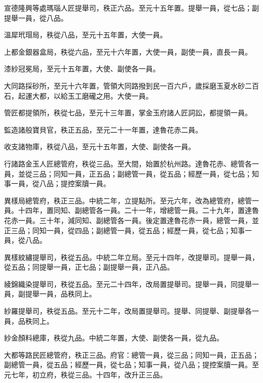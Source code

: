 \begin{pinyinscope}
 宣德隆興等處瑪瑙人匠提舉司，秩正六品。至元十五年置。提舉一員，從七品；副提舉一員，從八品。



 溫犀玳瑁局，秩從八品，至元十五年置，大使一員。



 上都金銀器盒局，秩從六品，至元十六年置，大使一員，副使一員，直長一員。



 漆紗冠冕局，至元十五年置，大使、副使各一員。



 大同路採砂所，至元十六年置，管領大同路撥到民一百六戶，歲採磨玉夏水砂二百石，起運大都，以給玉工磨礲之用。大使一員。



 管匠都提領所，秩從七品，至元十三年置，掌金玉府諸人匠詞訟，都提領一員。



 監造諸般寶貝官，秩正五品，至元二十一年置，達魯花赤二員。



 收支諸物庫，秩從八品，至元十五年置，大使、副使各一員。



 行諸路金玉人匠總管府，秩從三品。至大間，始置於杭州路。達魯花赤、總管各一員，並從三品；同知一員，正五品；副總管一員，從五品；經歷一員，從七品；知事一員，從八品；提控案牘一員。



 異樣局總管府，秩正三品。中統二年，立提點所。至元六年，改為總管府，總管一員。十四年，置同知、副總管各一員。二十一年，增總管一員。二十九年，置達魯花赤一員。三十年，減同知、副總管各一員。後定置達魯花赤一員，總管一員，並正三品；同知一員，從四品；副總管一員，從五品；經歷一員，從七品；知事一員，從八品。



 異樣紋繡提舉司，秩從五品。中統二年立局。至元十四年，改提舉司。提舉一員，從五品；同提舉一員，正七品；副提舉一員，正八品。



 綾錦織染提舉司，秩從五品。至元二十四年，改局置提舉司。提舉一員，同提舉一員，副提舉一員，品秩同上。



 紗羅提舉司，秩從五品。至元十二年，改局置提舉司。提舉、同提舉、副提舉各一員，品秩同上。



 紗金顏料總庫，秩從九品。中統二年置，大使、副使各一員，從九品。



 大都等路民匠總管府，秩正三品。府官：總管一員，從三品；同知一員，正五品；副總管一員，從五品；經歷一員，從七品；知事一員，從八品；提控案牘一員。至元七年，初立府，秩從三品。十四年，改升正三品。




\end{pinyinscope}

